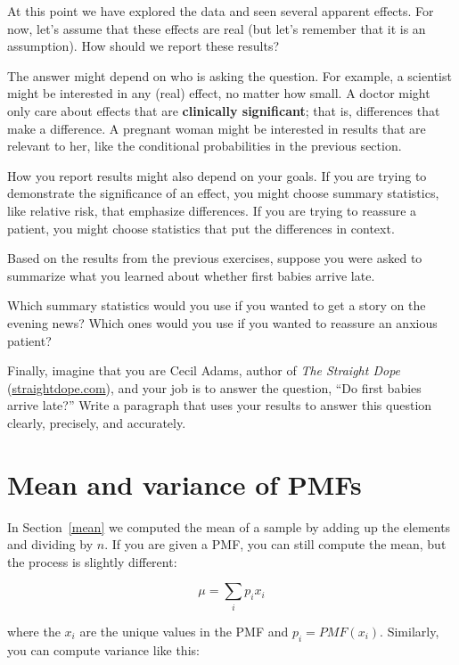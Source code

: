 \documentclass[10pt]{book}
\begin{document}
At this point we have explored the data and seen several apparent
effects.  For now, let's assume that these effects are real (but let's
remember that it is an assumption).  How should we report these
results?

The answer might depend on who is asking the question.  For example,
a scientist might be interested in any (real) effect, no matter how
small.  A doctor might only care about effects that are
{\bf clinically significant}; that is, differences that make a difference.
A pregnant woman might be interested in results that are relevant to
her, like the conditional probabilities in the previous section.

How you report results might also depend on your goals.  If you are
trying to demonstrate the significance of an effect, you might choose
summary statistics, like relative risk, that emphasize differences.
If you are trying to reassure a patient, you might choose statistics
that put the differences in context.

\begin{ex}

Based on the results from the previous exercises, suppose you were
asked to summarize what you learned about whether first
babies arrive late.

Which summary statistics would you use if you wanted to get a story
on the evening news?  Which ones would you use if you wanted to
reassure an anxious patient?

Finally, imagine that you are Cecil Adams, author of {\it The Straight
  Dope} (\url{straightdope.com}), and your job is to answer the
question, ``Do first babies arrive late?''  Write a paragraph that
uses your results to answer this question clearly, precisely, and
accurately.

\end{ex}


\section{Mean and variance of PMFs}

In Section~\ref{mean} we computed the mean of a sample by adding up
the elements and dividing by $n$.  If you are given a PMF, you can
still compute the mean, but the process is slightly different:

\[ \mu = \sum_i p_i x_i \]

where the $x_i$ are the unique values in the PMF and $p_i = PMF(x_i)$.
Similarly, you can compute variance like this:
\end{document}
